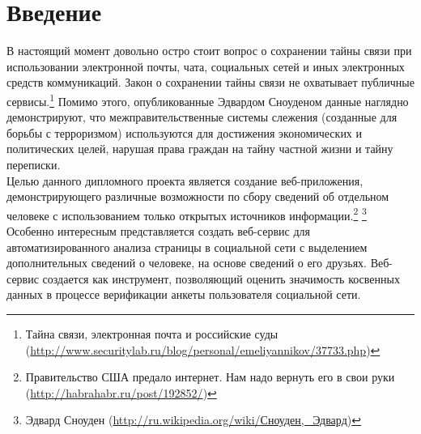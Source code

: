\newpage
\addtocounter{chapter}{1}
\tableofcontents
\newpage
\section{Введение}
В настоящий момент довольно остро стоит вопрос о сохранении тайны связи при использовании электронной почты, чата, социальных сетей и иных электронных средств коммуникаций. Закон о сохранении тайны связи не охватывает публичные сервисы.\footnote{ Тайна связи, электронная почта и российские суды (\url{http://www.securitylab.ru/blog/personal/emeliyannikov/37733.php})}
Помимо этого, опубликованные Эдвардом Сноуденом данные наглядно демонстрируют, что межправительственные системы слежения (созданные для борьбы с терроризмом) используются для достижения экономических и политических целей,  нарушая права граждан на тайну частной жизни и тайну переписки.\\

Целью данного дипломного проекта является создание веб-приложения, демонстрирующего различные возможности по сбору сведений об отдельном человеке с использованием только открытых источников информации.\footnote{Правительство США предало интернет. Нам надо вернуть его в свои руки (\url{http://habrahabr.ru/post/192852/})} \footnote{Эдвард Сноуден (\url{http://ru.wikipedia.org/wiki/Сноуден,\_Эдвард})}
Особенно интересным представляется создать веб-сервис для автоматизированного анализа страницы в социальной сети с выделением дополнительных сведений о человеке, на основе сведений о его друзьях. Веб-сервис создается как инструмент, позволяющий оценить значимость косвенных данных в процессе верификации  анкеты пользователя социальной сети.\\

